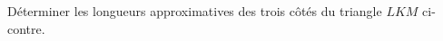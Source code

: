 
\begin{exercice}\label{exo2smath-0246}

    \begin{multicols}{2}

    Déterminer les longueurs approximatives des trois côtés du triangle \( LKM\) ci-contre. 

\columnbreak

       \begin{center}
       
   \end{center}

    \end{multicols}

\end{exercice}

